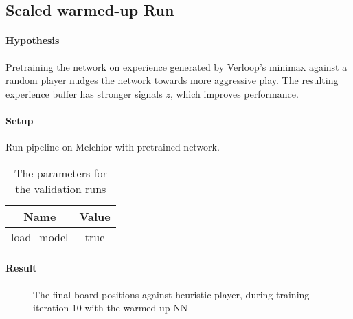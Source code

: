 \subsection{Scaled warmed-up Run}
\paragraph{Hypothesis} Pretraining the network on experience generated by Verloop's minimax against a random player nudges the network towards more aggressive play. The resulting experience buffer has stronger signals $z$, which improves performance.

\paragraph{Setup} Run pipeline on Melchior with pretrained network.

\begin{table}[!h]
    \begin{center}
        \begin{tabular}{ c|c }
            Name        & Value \\
            \hline
            \hline
            load\_model & true  \\
        \end{tabular}
    \end{center}
    \caption{The parameters for the validation runs}
\end{table}

\paragraph{Result}

\begin{figure}[!h]
    \centering
    \hfill
    \caption{}
    \label{performance_remote_warmed_up}
\end{figure}

\begin{figure}[!h]
    \centering
    \caption{The final board positions against heuristic player, during training iteration 10 with the warmed up NN}
    \label{performance_remote_warmed_up_heuristic}
\end{figure}

